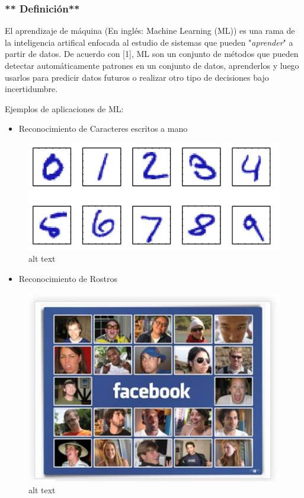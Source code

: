 \documentclass[11pt]{article}
\makeatletter
\def\maxwidth{\ifdim\Gin@nat@width>\linewidth\linewidth
    \else\Gin@nat@width\fi}
\let\Oldincludegraphics\includegraphics
\renewcommand{\includegraphics}[1]{\Oldincludegraphics[width=.8\maxwidth]{#1}}
\providecommand{\tightlist}{%
      \setlength{\itemsep}{0pt}\setlength{\parskip}{0pt}}
\makeatother
\begin{document}
    \subsubsection{** Definición**}\label{definiciuxf3n}

El aprendizaje de máquina (En inglés: Machine Learning (ML)) es una rama
de la inteligencia artifical enfocada al estudio de sistemas que pueden
"\emph{aprender}" a partir de datos. De acuerdo con {[}1{]}, ML son un
conjunto de métodos que pueden detectar automáticamente patrones en un
conjunto de datos, aprenderlos y luego usarlos para predicir datos
futuros o realizar otro tipo de decisiones bajo incertidumbre.

    Ejemplos de aplicaciones de ML:

    \begin{itemize}
\tightlist
\item
  Reconocimiento de Caracteres escritos a mano
\end{itemize}

    \begin{figure}[htbp]
\centering
\includegraphics{./Images/HR.png}
\caption{alt text}
\end{figure}

    \begin{itemize}
\tightlist
\item
  Reconocimiento de Rostros
\end{itemize}

    \begin{figure}[htbp]
\centering
\includegraphics{./Images/facebook-photo.jpeg}
\caption{alt text}
\end{figure}
\end{document}

